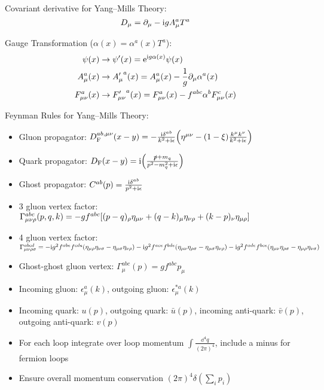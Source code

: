		\noindent
		Covariant derivative for Yang--Mills Theory:
		\begin{equation}
			D_\mu = \partial_\mu - \mathrm{i} g A_\mu^a T^a
		\end{equation}

		\noindent
		Gauge Transformation ($\alpha(x) = \alpha^a(x) T^a$):
		\begin{equation}
			\begin{aligned}
				\psi(x) & \to \psi'(x) = \mathrm{e}^{\mathrm{i} g \alpha(x)} \psi(x) \\
				A_\mu^a(x) & \to {A'_\mu}^a(x) = A_\mu^a(x) - \frac{1}{g} \partial_\mu \alpha^a(x) \\
				F_{\mu\nu}^a(x) & \to {F'_{\mu\nu}}^a(x) = F_{\mu\nu}^a(x) - f^{abc} \alpha^b F_{\mu\nu}^c(x)
			\end{aligned}
		\end{equation}

		\noindent
		Feynman Rules for Yang--Mills Theory:
		\begin{itemize}\itemsep -0pt
			\item Gluon propagator: $D_\text{F}^{ab,\mu\nu}(x-y) = -\frac{\mathrm{i} \delta^{ab}}{k^2+\mathrm{i}\epsilon} \qty(\eta^{\mu\nu}-(1-\xi)\frac{k^\mu k^\nu}{k^2+\mathrm{i}\epsilon} )$
			\item Quark propagator: $D_\text{F}(x-y) = \mathrm{i}\qty(\frac{\slashed{p}+m_q}{p^2-m_q^2+\mathrm{i}\epsilon})$
			\item Ghost propagator: $C^{ab}(p) = \frac{\mathrm{i}\delta^{ab}}{p^2+\mathrm{i}\epsilon}$
			\item 3 gluon vertex factor: $\Gamma^{abc}_{\mu\nu\rho}(p,q,k) = -gf^{abc} \qty[(p-q)_\rho \eta_{\mu\nu} + (q-k)_\mu \eta_{\nu\rho} + (k-p)_\nu \eta_{\mu\rho}]$
			\item 4 gluon vertex factor: $\Gamma^{abcd}_{\mu\nu\rho\sigma} = -\mathrm{i} g^2 f^{abe}f^{cde}(\eta_{\mu\rho}\eta_{\nu\sigma} - \eta_{\mu\sigma}\eta_{\nu\rho}) - \mathrm{i} g^2 f^{ace}f^{bde} (\eta_{\mu\nu}\eta_{\rho\sigma} - \eta_{\mu\sigma}\eta_{\nu\rho}) - \mathrm{i} g^2 f^{ade} f^{bce} (\eta_{\mu\nu}\eta_{\rho\sigma} - \eta_{\mu\rho}\eta_{\nu\sigma})$
			\item Ghost-ghost gluon vertex: $\Gamma^{abc}_\mu(p) = gf^{abc} p_\mu$
			\item Incoming gluon: $\epsilon^a_\mu(k)$, outgoing gluon: $\epsilon^{*a}_\mu(k)$
			\item Incoming quark: $u(p)$, outgoing quark: $\bar{u}(p)$, incoming anti-quark: $\bar{v}(p)$, outgoing anti-quark: $v(p)$
			\item For each loop integrate over loop momentum $\int \frac{\dd^4 q}{(2\pi)^4}$, include a minus for fermion loops
			\item Ensure overall momentum conservation $(2\pi)^4 \delta(\sum_i p_i)$
		\end{itemize}

